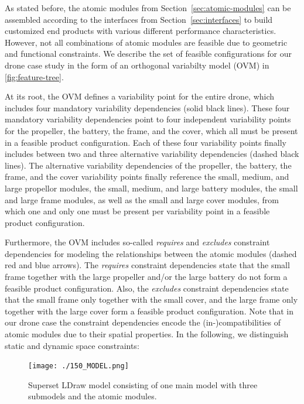 \documentclass[sigconf,review]{acmart}
\begin{document}
As stated before, the atomic modules from Section~\ref{sec:atomic-modules} can be assembled according to the interfaces from Section~\ref{sec:interfaces} to build customized end products with various different performance characteristics.
However, not all combinations of atomic modules are feasible due to geometric and functional constraints.
We describe the set of feasible configurations for our drone case study in the form of an orthogonal variabilty model (OVM) in \cref{fig:feature-tree}.

At its root, the OVM defines a variability point for the entire drone, which includes four mandatory variability dependencies (solid black lines).
These four mandatory variability dependencies point to four independent variability points for the propeller, the battery, the frame, and the cover, which all must be present in a feasible product configuration.
Each of these four variability points finally includes between two and three alternative variability dependencies (dashed black lines).
The alternative variability dependencies of the propeller, the battery, the frame, and the cover variability points finally reference the small, medium, and large propellor modules, the small, medium, and large battery modules, the small and large frame modules, as well as the small and large cover modules, from which one and only one must be present per variability point in a feasible product configuration.

Furthermore, the OVM includes so-called \textit{requires} and \textit{excludes} constraint dependencies for modeling the relationships between the atomic modules (dashed red and blue arrows).
The \textit{requires} constraint dependencies state that the small frame together with the large propeller and/or the large battery do not form a feasible product configuration.
Also, the \textit{excludes} constraint dependencies state that the small frame only together with the small cover, and the large frame only together with the large cover form a feasible product configuration.
Note that in our drone case the constraint dependencies encode the (in-)compatibilities of atomic modules due to their spatial properties.
In the following, we distinguish static and dynamic space constraints:

\begin{figure}[tbp]
    \texttt{[image: ./150\_MODEL.png]}
    \caption{Superset LDraw model consisting of one main model with three submodels and the atomic modules.}
    \label{fig:150-model}
\end{figure}
\end{document}
